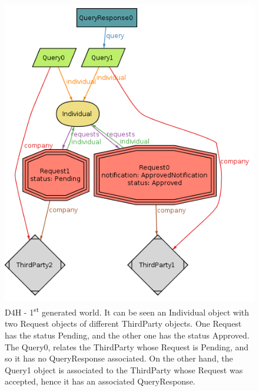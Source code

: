 \documentclass[a4paper, hidelinks, 12pt]{report}
\begin{document}
	\begin{figure}[H]
		\centering
		\includegraphics[scale=0.55]{Diagrams/goal_2_world_1.png}
		\caption[D4H - First generated world]{D4H - 1\textsuperscript{st} generated world. It can be seen an Individual object with two Request objects of different ThirdParty objects. One Request has the status Pending, and the other one has the status Approved. The Query0, relates the ThirdParty whose Request is Pending, and so it has no QueryResponse associated. On the other hand, the Query1 object is associated to the ThirdParty whose Request was accepted, hence it has an associated QueryResponse.}
		\label{fig:goal_2_world_1}
	\end{figure}
	
\end{document}
